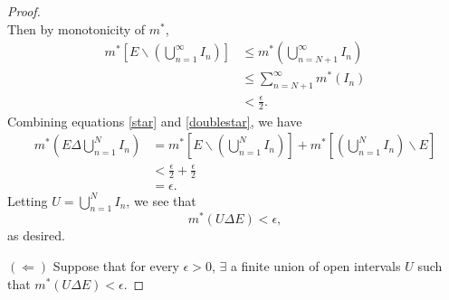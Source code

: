 \documentclass{article}
\begin{document}
\begin{proof}
\begin{equation}
	\end{equation}
	Then by monotonicity of $m^*$,
	\begin{align}\label{doublestar}
		m^*\left[E\backslash \left(\bigcup_{n=1}^{\infty}I_n\right)\right] &\leq m^*\left(\bigcup_{n=N+1}^{\infty}I_n\right) \nonumber \\
		&\leq \sum_{n=N+1}^{\infty}m^*(I_n) \nonumber \\
		&< \frac{\epsilon}{2}.
	\end{align}
	Combining equations \eqref{star} and \eqref{doublestar}, we have
	\begin{align}
		m^*\left(E \Delta \bigcup_{n=1}^N I_n\right)&= m^*\left[E \backslash \left(\bigcup_{n=1}^N I_n\right)\right] + m^*\left[\left(\bigcup_{n=1}^N I_n\right) \backslash E\right] \\
		&< \frac{\epsilon}{2} + \frac{\epsilon}{2} \\
		&= \epsilon.
	\end{align}
	Letting $U = \bigcup_{n=1}^N I_n$, we see that
	\begin{equation}
		m^*(U \Delta E) < \epsilon,
	\end{equation}
	as desired.
	
	$(\Leftarrow)$ Suppose that for every $\epsilon > 0$, $\exists$ a finite union of open intervals $U$ such that $m^*(U \Delta E) < \epsilon$.
	

\end{proof}
\end{document}
